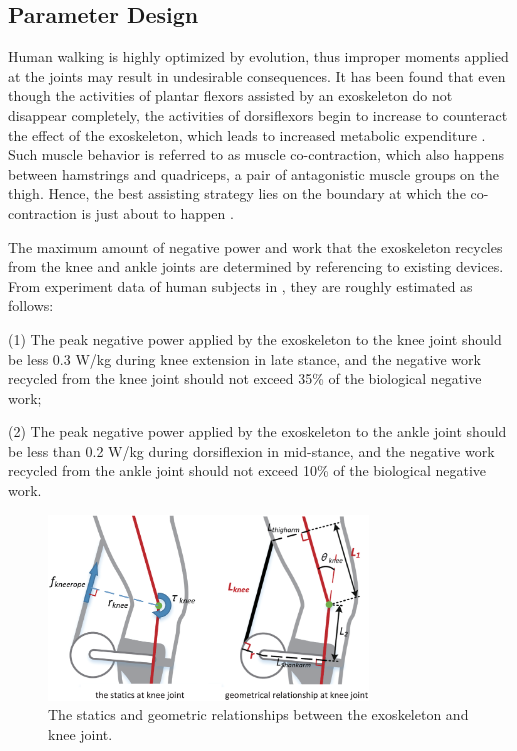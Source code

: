 \documentclass[twocolumn,cleanfoot,10pt]{asme2ej}
\begin{document}
\subsection{Parameter Design}

\label{sec:parameter design}

Human walking is highly optimized by evolution, thus improper moments applied at the joints may result in undesirable consequences.
It has been found that even though the activities of plantar flexors assisted by an exoskeleton do not disappear completely, the activities of dorsiflexors begin to increase to counteract the effect of the exoskeleton, which leads to increased metabolic expenditure \cite{RN4}.
Such muscle behavior is referred to as muscle co-contraction, which also happens between hamstrings and quadriceps, a pair of antagonistic muscle groups on the thigh.
Hence, the best assisting strategy lies on the boundary at which the co-contraction is just about to happen \cite{RN22}. 

The maximum amount of negative power and work that the exoskeleton recycles from the knee and ankle joints are determined by referencing to existing devices.
From experiment data of human subjects in \cite{RN5,RN18}, they are roughly estimated as follows:

(1) The peak negative power applied by the exoskeleton to the knee joint should be less 0.3 W/kg during knee extension in late stance, and the negative work recycled from the knee joint should not exceed 35\% of the biological negative work;

(2) The peak negative power applied by the exoskeleton to the ankle joint should be less than 0.2 W/kg during dorsiflexion in mid-stance, and the negative work recycled from the ankle joint should not exceed 10\% of the biological negative work.

\begin{figure}[t]
	\centering
	\includegraphics[width=8.5cm]{kneeparameters.eps}
	\caption{The statics and geometric relationships between the exoskeleton and knee joint.}
	\label{fig:kneeparameters}
\end{figure}
\end{document}
